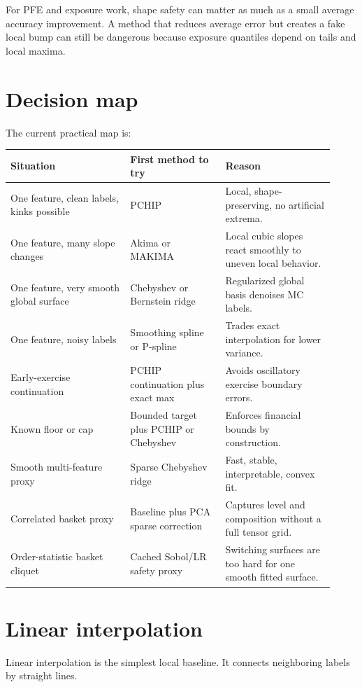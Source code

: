 \documentclass[11pt,oneside]{book}
\theoremstyle{definition}
\begin{document}
For PFE and exposure work, shape safety can matter as much as a small average
accuracy improvement. A method that reduces average error but creates a fake
local bump can still be dangerous because exposure quantiles depend on tails
and local maxima.

\section{Decision map}
The current practical map is:
\begin{longtable}{@{}>{\raggedright\arraybackslash}p{0.34\linewidth}>{\raggedright\arraybackslash}p{0.27\linewidth}>{\raggedright\arraybackslash}p{0.31\linewidth}@{}}
\toprule
Situation & First method to try & Reason\\
\midrule
One feature, clean labels, kinks possible & PCHIP & Local, shape-preserving, no artificial extrema.\\
One feature, many slope changes & Akima or MAKIMA & Local cubic slopes react smoothly to uneven local behavior.\\
One feature, very smooth global surface & Chebyshev or Bernstein ridge & Regularized global basis denoises MC labels.\\
One feature, noisy labels & Smoothing spline or P-spline & Trades exact interpolation for lower variance.\\
Early-exercise continuation & PCHIP continuation plus exact max & Avoids oscillatory exercise boundary errors.\\
Known floor or cap & Bounded target plus PCHIP or Chebyshev & Enforces financial bounds by construction.\\
Smooth multi-feature proxy & Sparse Chebyshev ridge & Fast, stable, interpretable, convex fit.\\
Correlated basket proxy & Baseline plus PCA sparse correction & Captures level and composition without a full tensor grid.\\
Order-statistic basket cliquet & Cached Sobol/LR safety proxy & Switching surfaces are too hard for one smooth fitted surface.\\
\bottomrule
\end{longtable}

\section{Linear interpolation}
Linear interpolation is the simplest local baseline. It connects neighboring
labels by straight lines.
\end{document}
